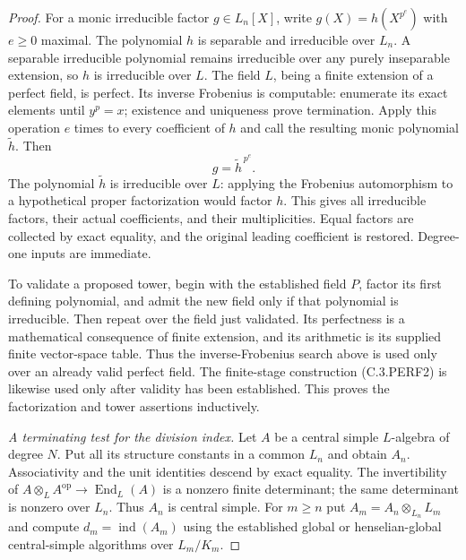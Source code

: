 \begin{proof}
For a monic irreducible factor $g\in L_n[X]$, write
$g(X)=h(X^{p^e})$ with $e\ge0$ maximal.  The polynomial $h$ is
separable and irreducible over $L_n$.  A separable irreducible
polynomial remains irreducible over any purely inseparable extension,
so $h$ is irreducible over $L$.
The field $L$, being a finite extension of a perfect field, is perfect.
Its inverse Frobenius is computable: enumerate its exact elements
until $y^p=x$; existence and uniqueness prove termination.
Apply this operation $e$ times to every coefficient of $h$ and call
the resulting monic polynomial $\widetilde h$.  Then
\[
                         g=\widetilde h^{\,p^e}.         \tag{C.3.PERF3}
\]
The polynomial $\widetilde h$ is irreducible over $L$: applying the
Frobenius automorphism to a hypothetical proper factorization would
factor $h$.  This gives all irreducible factors, their actual
coefficients, and their multiplicities.  Equal factors are collected
by exact equality, and the original leading coefficient is restored.
Degree-one inputs are immediate.

To validate a proposed tower, begin with the established field $P$,
factor its first defining polynomial, and admit the new field only
if that polynomial is irreducible.  Then repeat over the field just
validated.  Its perfectness is a mathematical consequence of finite
extension, and its arithmetic is its supplied finite vector-space
table.  Thus the inverse-Frobenius search above is used only over
an already valid perfect field.  The finite-stage construction
(C.3.PERF2) is likewise used only after validity has been established.
This proves the factorization and tower assertions inductively.

\emph{A terminating test for the division index.}
Let $A$ be a central simple $L$-algebra of degree $N$.
Put all its structure constants in a common $L_n$ and obtain $A_n$.
Associativity and the unit identities descend by exact equality.
The invertibility of
$A\otimes_L A^{\mathrm{op}}\longrightarrow\operatorname{End}_L(A)$
is a nonzero finite determinant; the same determinant is nonzero
over $L_n$.  Thus $A_n$ is central simple.  For $m\ge n$ put
$A_m=A_n\otimes_{L_n}L_m$ and compute $d_m=\operatorname{ind}(A_m)$
using the established global or henselian-global central-simple
algorithms over $L_m/K_m$.


\end{proof}

